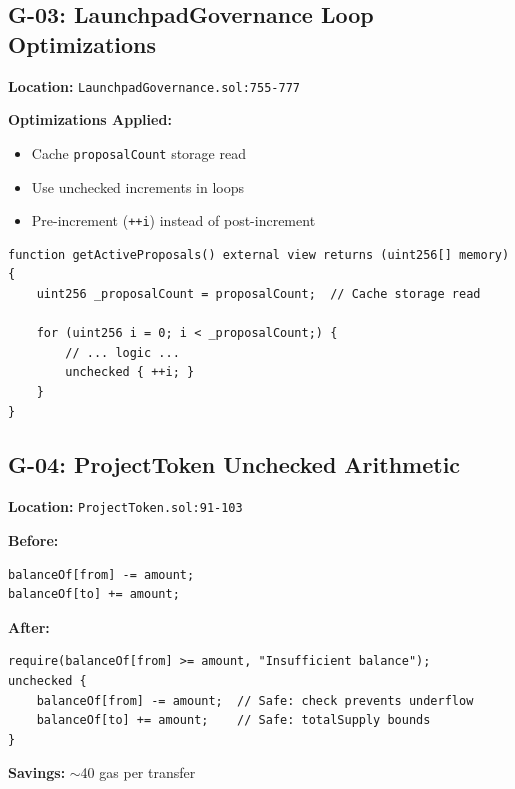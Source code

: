 \documentclass[11pt,a4paper]{article}
\begin{document}
\begin{gasbox}
\subsection{G-03: LaunchpadGovernance Loop Optimizations}
\end{gasbox}

\textbf{Location:} \texttt{LaunchpadGovernance.sol:755-777}

\textbf{Optimizations Applied:}
\begin{itemize}
    \item Cache \texttt{proposalCount} storage read
    \item Use unchecked increments in loops
    \item Pre-increment (\texttt{++i}) instead of post-increment
\end{itemize}

\begin{lstlisting}
function getActiveProposals() external view returns (uint256[] memory) {
    uint256 _proposalCount = proposalCount;  // Cache storage read

    for (uint256 i = 0; i < _proposalCount;) {
        // ... logic ...
        unchecked { ++i; }
    }
}
\end{lstlisting}

\vspace{1em}

\begin{gasbox}
\subsection{G-04: ProjectToken Unchecked Arithmetic}
\end{gasbox}

\textbf{Location:} \texttt{ProjectToken.sol:91-103}

\textbf{Before:}
\begin{lstlisting}
balanceOf[from] -= amount;
balanceOf[to] += amount;
\end{lstlisting}

\textbf{After:}
\begin{lstlisting}
require(balanceOf[from] >= amount, "Insufficient balance");
unchecked {
    balanceOf[from] -= amount;  // Safe: check prevents underflow
    balanceOf[to] += amount;    // Safe: totalSupply bounds
}
\end{lstlisting}

\textbf{Savings:} $\sim$40 gas per transfer
\end{document}
